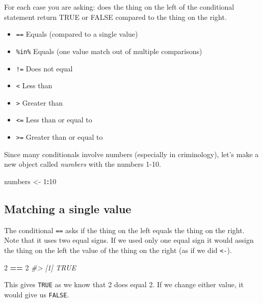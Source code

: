 \documentclass[
  12pt,
]{book}
\newenvironment{Shaded}{\begin{snugshade}}{\end{snugshade}}
\newcommand{\CommentTok}[1]{\textcolor[rgb]{0.56,0.35,0.01}{\textit{#1}}}
\newcommand{\DecValTok}[1]{\textcolor[rgb]{0.00,0.00,0.81}{#1}}
\newcommand{\NormalTok}[1]{#1}
\newcommand{\OperatorTok}[1]{\textcolor[rgb]{0.81,0.36,0.00}{\textbf{#1}}}
\newcommand{\StringTok}[1]{\textcolor[rgb]{0.31,0.60,0.02}{#1}}
\providecommand{\tightlist}{%
  \setlength{\itemsep}{0pt}\setlength{\parskip}{0pt}}
\begin{document}
For each case you are asking: does the thing on the left of the conditional statement return TRUE or FALSE compared to the thing on the right.

\begin{itemize}
\tightlist
\item
  \texttt{==} Equals (compared to a single value)
\item
  \texttt{\%in\%} Equals (one value match out of multiple comparisons)
\item
  \texttt{!=} Does not equal
\item
  \texttt{\textless{}} Less than
\item
  \texttt{\textgreater{}} Greater than
\item
  \texttt{\textless{}=} Less than or equal to
\item
  \texttt{\textgreater{}=} Greater than or equal to
\end{itemize}

Since many conditionals involve numbers (especially in criminology), let's make a new object called \emph{numbers} with the numbers 1-10.

\begin{Shaded}
\begin{Highlighting}[]
\NormalTok{numbers <{-}}\StringTok{ }\DecValTok{1}\OperatorTok{:}\DecValTok{10}
\end{Highlighting}
\end{Shaded}

\hypertarget{matching-a-single-value}{%
\subsection{Matching a single value}\label{matching-a-single-value}}

The conditional \texttt{==} asks if the thing on the left equals the thing on the right. Note that it uses two equal signs. If we used only one equal sign it would assign the thing on the left the value of the thing on the right (as if we did \texttt{\textless{}-}).

\begin{Shaded}
\begin{Highlighting}[]
\DecValTok{2} \OperatorTok{==}\StringTok{ }\DecValTok{2}
\CommentTok{\#> [1] TRUE}
\end{Highlighting}
\end{Shaded}

This gives \texttt{TRUE} as we know that 2 does equal 2. If we change either value, it would give us \texttt{FALSE}.
\end{document}
